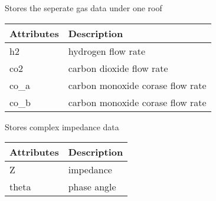 \documentclass[letterpaper,10pt,english]{sphinxmanual}
\begin{document}

\begin{fulllineitems}
\label{\detokenize{data:data.Gas}}
Stores the seperate gas data under one roof


\begin{savenotes}\sphinxattablestart
\centering
\begin{tabulary}{\linewidth}[t]{|T|T|}
\hline
\sphinxstyletheadfamily 
Attributes
&\sphinxstyletheadfamily 
Description
\\
\hline
h2
&
hydrogen flow rate
\\
\hline
co2
&
carbon dioxide flow rate
\\
\hline
co\_a
&
carbon monoxide corase flow rate
\\
\hline
co\_b
&
carbon monoxide corase flow rate
\\
\hline
\end{tabulary}
\par
\sphinxattableend\end{savenotes}

\end{fulllineitems}


\begin{fulllineitems}
\label{\detokenize{data:data.Impedance}}
Stores complex impedance data


\begin{savenotes}\sphinxattablestart
\centering
\begin{tabulary}{\linewidth}[t]{|T|T|}
\hline
\sphinxstyletheadfamily 
Attributes
&\sphinxstyletheadfamily 
Description
\\
\hline
Z
&
impedance
\\
\hline
theta
&
phase angle
\\
\hline
\end{tabulary}
\par
\sphinxattableend\end{savenotes}

\end{fulllineitems}

\end{document}
